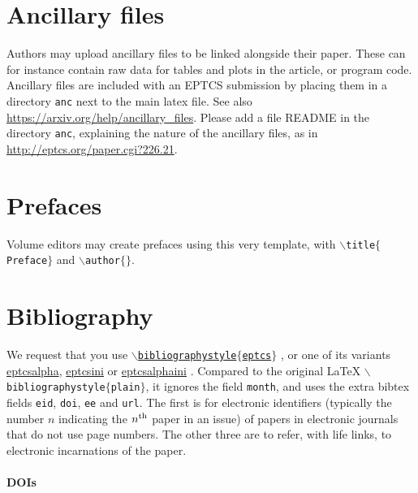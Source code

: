 \documentclass[submission,copyright,creativecommons]{eptcs}
\begin{document}
\section{Ancillary files}

Authors may upload ancillary files to be linked alongside their paper.
These can for instance contain raw data for tables and plots in the
article, or program code.  Ancillary files are included with an EPTCS
submission by placing them in a directory \texttt{anc} next to the
main latex file. See also \url{https://arxiv.org/help/ancillary_files}.
Please add a file README in the directory \texttt{anc}, explaining the
nature of the ancillary files, as in
\url{http://eptcs.org/paper.cgi?226.21}.

\section{Prefaces}

Volume editors may create prefaces using this very template,
with {\tt $\backslash$title$\{$Preface$\}$} and {\tt $\backslash$author$\{\}$}.

\section{Bibliography}

We request that you use
\href{http://eptcs.web.cse.unsw.edu.au/eptcs.bst}
{\tt $\backslash$bibliographystyle$\{$eptcs$\}$}
\cite{bibliographystylewebpage}, or one of its variants
\href{http://eptcs.web.cse.unsw.edu.au/eptcsalpha.bst}{eptcsalpha},
\href{http://eptcs.web.cse.unsw.edu.au/eptcsini.bst}{eptcsini} or
\href{http://eptcs.web.cse.unsw.edu.au/eptcsalphaini.bst}{eptcsalphaini}
\cite{bibliographystylewebpage}. Compared to the original {\LaTeX}
{\tt $\backslash$biblio\-graphystyle$\{$plain$\}$},
it ignores the field {\tt month}, and uses the extra
bibtex fields {\tt eid}, {\tt doi}, {\tt ee} and {\tt url}.
The first is for electronic identifiers (typically the number $n$
indicating the $n^{\rm th}$ paper in an issue) of papers in electronic
journals that do not use page numbers. The other three are to refer,
with life links, to electronic incarnations of the paper.

\paragraph{DOIs}
\end{document}
